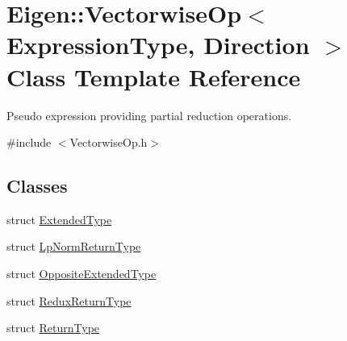 \hypertarget{class_eigen_1_1_vectorwise_op}{}\section{Eigen\+::Vectorwise\+Op$<$ Expression\+Type, Direction $>$ Class Template Reference}
\label{class_eigen_1_1_vectorwise_op}


Pseudo expression providing partial reduction operations.  




{\ttfamily \#include $<$Vectorwise\+Op.\+h$>$}

\subsection*{Classes}
\begin{DoxyCompactItemize}
\item 
struct \mbox{\hyperlink{struct_eigen_1_1_vectorwise_op_1_1_extended_type}{Extended\+Type}}
\item 
struct \mbox{\hyperlink{struct_eigen_1_1_vectorwise_op_1_1_lp_norm_return_type}{Lp\+Norm\+Return\+Type}}
\item 
struct \mbox{\hyperlink{struct_eigen_1_1_vectorwise_op_1_1_opposite_extended_type}{Opposite\+Extended\+Type}}
\item 
struct \mbox{\hyperlink{struct_eigen_1_1_vectorwise_op_1_1_redux_return_type}{Redux\+Return\+Type}}
\item 
struct \mbox{\hyperlink{struct_eigen_1_1_vectorwise_op_1_1_return_type}{Return\+Type}}
\end{DoxyCompactItemize}
